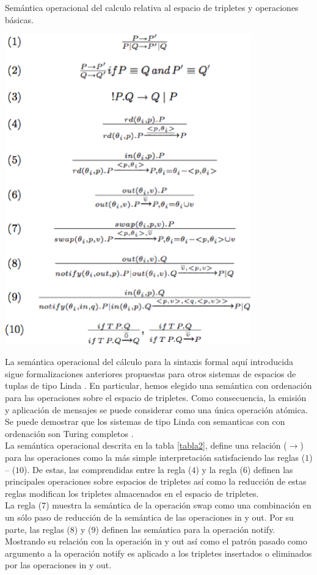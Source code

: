 \begin{table}
\vspace{2.4in}
\caption{Sem\'antica operacional del calculo relativa al espacio de tripletes y operaciones b\'asicas.}
\includegraphics[width=0.8\textwidth]{tabla2}
\label{tabla2}
\end{table}

La sem\'antica operacional del c\'alculo para la sintaxis formal aqu\'i introducida sigue formalizaciones anteriores propuestas para otros sistemas de espacios de tuplas de tipo Linda \cite{linda}. En particular, hemos elegido una sem\'antica con ordenaci\'on para las operaciones sobre el espacio de tripletes. Como consecuencia, la emisi\'on y aplicaci\'on de mensajes se puede considerar como una \'unica operaci\'on at\'omica. Se puede demostrar que los sistemas de tipo Linda con semanticas con con ordenaci\'on son Turing completos \cite{busi2000expressiveness}.\\
La sem\'antica operacional descrita en la tabla \ref{tabla2}, define una relaci\'on ($\rightarrow$) para las operaciones como la m\'as simple interpretaci\'on satisfaciendo las reglas ($1$) – ($10$). De estas, las comprendidas entre la regla ($4$)  y la regla ($6$) definen las principales operaciones sobre espacios de tripletes as\'i como la reducci\'on de estas reglas modifican los tripletes almacenados en el espacio de tripletes.\\
La regla ($7$) muestra la sem\'antica de la operaci\'on swap como una combinaci\'on en un s\'olo paso de reducci\'on de la sem\'antica de las operaciones in y out. Por su parte, las reglas ($8$) y ($9$) definen las sem\'antica para la operaci\'on notify. Mostrando su relaci\'on con la operaci\'on in y out as\'i como el patr\'on pasado como argumento a la operaci\'on notify es aplicado a los tripletes insertados o eliminados por las operaciones in y out.\\

